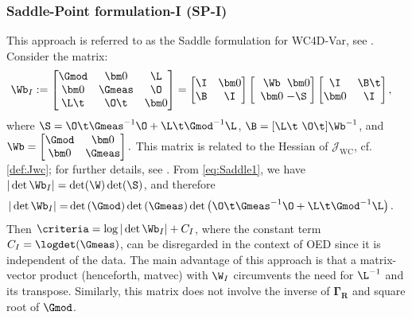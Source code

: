 \documentclass{aims} %
\theoremstyle{definition}
\begin{document}
\subsubsection{Saddle-Point formulation-I (SP-I)}
%
    This approach is referred to as the Saddle formulation for WC4D-Var, see \cite[Section 2]{Gratton}. Consider the matrix:
\begin{align}
\begin{aligned}
\Wb_I & :=
\begin{bmatrix}
  \Gmod & \bm 0 & \L \\
  \bm 0 & \Gmeas & \O \\
  \L\t & \O\t & \bm 0 \\
\end{bmatrix}
=
\begin{bmatrix}
  \I  & \bm 0 \\
 \B &  \I \\
\end{bmatrix}
\left[ 
\begin{array}{c@{}c@{}c}
\Wb 
  & ~\bm 0  \\
  \bm 0  & -\S
\end{array}\right] 
\begin{bmatrix}
  \I  & \B\t \\
 \bm 0 &  \I \\
\end{bmatrix},
 \end{aligned} \label{eq:Saddle1}
\end{align}
where $\S = \O\t \Gmeas^{-1} \O + \L\t \Gmod^{-1} \L$, $\B =[\L\t~\O\t ]\Wb^{-1} $, and  $\Wb=
    \begin{bmatrix}
  \Gmod & \bm 0  \\
  \bm 0 & \Gmeas 
\end{bmatrix}.$ \newline
%
This matrix  is related to the Hessian of $\mathcal{J}_{\text{WC}}$, cf.  \eqref{def:Jwc}; for further details, see \cite{boyd2004convex, HIGHAM1998261}. 
From   \eqref{eq:Saddle1}, we have $|\det \Wb_I| = \det(\W)\det(\S)$, and therefore
\begin{align*}
    |\det \Wb_I| 
            =&  \det\left(\Gmod \right)\det\left(\Gmeas \right) \det\left( 
             \O\t \Gmeas^{-1} \O + \L\t \Gmod^{-1} \L \right).
\end{align*}
 Then  $\criteria = \log|\det \Wb_I| + C_{I}$, where the constant term $C_{I} = \logdet(\Gmeas)$, can be disregarded in the context of OED since it is independent of the data. The main advantage of this approach is that a matrix-vector product (henceforth, matvec) with $\W_I$ circumvents the need for $\L^{-1}$ and its transpose.
 Similarly, this matrix does not involve the inverse of $\bm\Gamma_{\bm R}$ and square root of $\Gmod$. 
%
\end{document}

